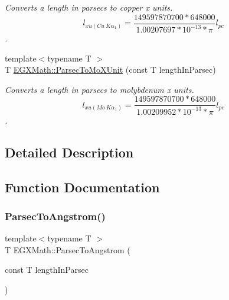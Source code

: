 \begin{DoxyCompactItemize}
\begin{DoxyCompactList}\small\item\em Converts a length in parsecs to copper x units. \[ l_{xu(Cu\ K\alpha_1)}= \frac{149597870700 * 648000}{1.00207697*10^{-13} * \pi} l_{pc}\]. \end{DoxyCompactList}\item 
{\footnotesize template$<$typename T $>$ }\\T \mbox{\hyperlink{group___e_g_x_math-_conversions-_length_conversions-_astronomical-_parsec-_non-_s_i_gaf076c4eb125bbc9fbabc040300961b6d}{E\+G\+X\+Math\+::\+Parsec\+To\+Mo\+X\+Unit}} (const T length\+In\+Parsec)
\begin{DoxyCompactList}\small\item\em Converts a length in parsecs to molybdenum x units. \[ l_{xu(Mo\ K\alpha_1)}=\frac{149597870700 * 648000}{1.00209952*10^{-13}* \pi} l_{pc}\]. \end{DoxyCompactList}\end{DoxyCompactItemize}


\subsection{Detailed Description}


\subsection{Function Documentation}
\mbox{\label{group___e_g_x_math-_conversions-_length_conversions-_astronomical-_parsec-_non-_s_i_gae9721658cb4d8b9e1cfd85f20d646702}} 
\subsubsection{\texorpdfstring{Parsec\+To\+Angstrom()}{ParsecToAngstrom()}}
{\footnotesize\ttfamily template$<$typename T $>$ \\
T E\+G\+X\+Math\+::\+Parsec\+To\+Angstrom (\begin{DoxyParamCaption}\item[{const T}]{length\+In\+Parsec }\end{DoxyParamCaption})}



